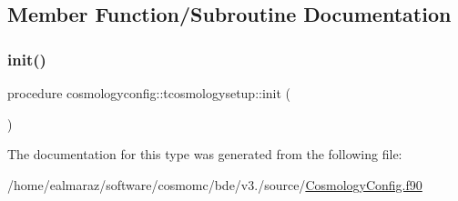 \subsection{Member Function/\+Subroutine Documentation}
\mbox{\label{structcosmologyconfig_1_1tcosmologysetup_af918816304b620f36adf51d4bbec1675}} 
\subsubsection{\texorpdfstring{init()}{init()}}
{\footnotesize\ttfamily procedure cosmologyconfig\+::tcosmologysetup\+::init (\begin{DoxyParamCaption}{ }\end{DoxyParamCaption})\hspace{0.3cm}{\ttfamily [private]}}



The documentation for this type was generated from the following file\+:\begin{DoxyCompactItemize}
\item 
/home/ealmaraz/software/cosmomc/bde/v3./source/\mbox{\hyperlink{CosmologyConfig_8f90}{Cosmology\+Config.\+f90}}\end{DoxyCompactItemize}
